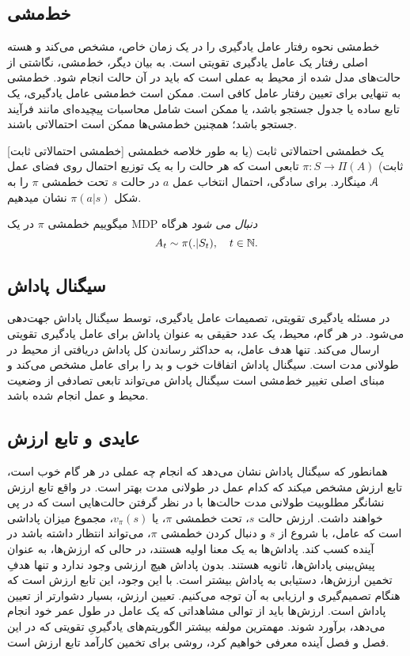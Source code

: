 \subsection{خط‌مشی}
خط‌مشی نحوه رفتار عامل یادگیری را در یک زمان خاص، مشخص می‌کند و هسته اصلی رفتار یک عامل یادگیری تقویتی است. به بیان دیگر، خط‌مشی، نگاشتی از حالت‌های مدل شده از محیط به عملی است که باید در آن حالت انجام شود. خط‌مشی به تنهایی برای تعیین رفتار عامل کافی است. ممکن است
خط‌مشی عامل یادگیری، یک تابع ساده یا جدول جستجو باشد، یا ممکن است شامل محاسبات پیچیده‌ای مانند فرآیند جستجو باشد؛ همچنین
خط‌مشی‌ها ممکن است احتمالاتی باشند.

[خط\nf مشی احتمالاتی ثابت]
یک خط\nf مشی احتمالاتی ثابت (یا به طور خلاصه خط\nf مشی ثابت) 
$\pi: S \to \Pi(A)$
تابعی است که هر حالت را به یک توزیع احتمال روی فضای عمل
$\EuScript{A}$
 می\nf نگارد.
برای سادگی، احتمال انتخاب عمل $a$ در حالت $s$ تحت خط\nf مشی $\pi$ را به شکل
$\pi(a|s)$
نشان می\nf دهیم.


می\nf گوییم خط\nf مشی $\pi$ در یک
 MDP
  \textit{دنبال می
  	\nf
  	 شود}
   هرگاه
$$A_t \sim \pi(. |S_t),	 \quad t \in \mathbb{N}.$$


\subsection{سیگنال پاداش}

در مسئله یادگیری تقویتی، تصمیمات عامل یادگیری، توسط سیگنال پاداش جهت‌دهی می‌شود. در هر گام، محیط، یک عدد حقیقی به عنوان پاداش برای عامل یادگیری تقویتی ارسال می‌کند. تنها هدف عامل، به حداکثر رساندن کل پاداش دریافتی از محیط در طولانی مدت است. سیگنال پاداش اتفاقات خوب و بد را برای عامل مشخص می‌کند و مبنای اصلی تغییر خط‌مشی است
سیگنال پاداش می‌تواند تابعی تصادفی از وضعیت محیط و عمل انجام شده باشد.


\subsection{عایدی و تابع ارزش}
همانطور که سیگنال پاداش نشان می‌دهد که انجام چه عملی در هر گام خوب است، تابع ارزش مشخص می\nf کند که کدام عمل در طولانی مدت بهتر است. در واقع تابع ارزش نشانگر مطلوبیت طولانی مدت حالت‌ها با در نظر گرفتن حالت‌هایی است که در پی خواهند داشت.
ارزش حالت $s$، تحت خط\nf مشی $\pi$، یا
 $v_\pi(s)$،
مجموع میزان پاداشی است که عامل، با شروع از $s$ و دنبال کردن خط\nf مشی $\pi$، می‌تواند انتظار داشته باشد در آینده کسب کند.
پاداش‌ها به یک معنا اولیه هستند، در حالی که ارزش‌ها، به عنوان پیش‌بینی پاداش‌ها، ثانویه هستند. بدون پاداش هیچ ارزشی وجود ندارد و تنها هدفِ تخمین ارزش‌ها، دستیابی به پاداش بیشتر است. با این وجود، این تابع ارزش است که هنگام تصمیم‌گیری و ارزیابی به آن توجه می‌کنیم.
تعیین ارزش،‌ بسیار دشوارتر از تعیین پاداش است.
ارزش‌ها باید از توالی مشاهداتی که یک عامل در طول عمر خود انجام می‌دهد، برآورد شوند.
مهمترین مولفه بیشتر الگوریتم‌های یادگیریِ تقویتی که در  این فصل و فصل آینده معرفی خواهیم کرد، روشی برای تخمین کارآمد تابع ارزش است.

